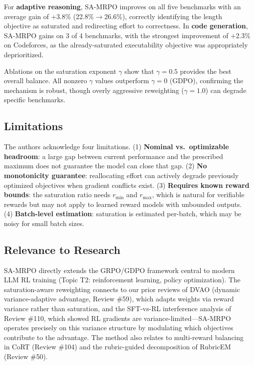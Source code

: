 \documentclass[11pt,a4paper]{article}
\begin{document}
For \textbf{adaptive reasoning}, SA-MRPO improves on all five benchmarks with an average gain of +3.8\% (22.8\%$\to$26.6\%), correctly identifying the length objective as saturated and redirecting effort to correctness. In \textbf{code generation}, SA-MRPO gains on 3 of 4 benchmarks, with the strongest improvement of +2.3\% on Codeforces, as the already-saturated executability objective was appropriately deprioritized.

Ablations on the saturation exponent $\gamma$ show that $\gamma = 0.5$ provides the best overall balance. All nonzero $\gamma$ values outperform $\gamma = 0$ (GDPO), confirming the mechanism is robust, though overly aggressive reweighting ($\gamma = 1.0$) can degrade specific benchmarks.

\subsection{Limitations}
The authors acknowledge four limitations. (1) \textbf{Nominal vs.\ optimizable headroom}: a large gap between current performance and the prescribed maximum does not guarantee the model can close that gap. (2) \textbf{No monotonicity guarantee}: reallocating effort can actively degrade previously optimized objectives when gradient conflicts exist. (3) \textbf{Requires known reward bounds}: the saturation ratio needs $r_{\min}$ and $r_{\max}$, which is natural for verifiable rewards but may not apply to learned reward models with unbounded outputs. (4) \textbf{Batch-level estimation}: saturation is estimated per-batch, which may be noisy for small batch sizes.

\subsection{Relevance to Research}
SA-MRPO directly extends the GRPO/GDPO framework central to modern LLM RL training (Topic T2: reinforcement learning, policy optimization). The saturation-aware reweighting connects to our prior reviews of DVAO (dynamic variance-adaptive advantage, Review \#59), which adapts weights via reward variance rather than saturation, and the SFT-vs-RL interference analysis of Review \#110, which showed RL gradients are variance-limited---SA-MRPO operates precisely on this variance structure by modulating which objectives contribute to the advantage. The method also relates to multi-reward balancing in CoRT (Review \#104) and the rubric-guided decomposition of RubricEM (Review \#50).
\end{document}
